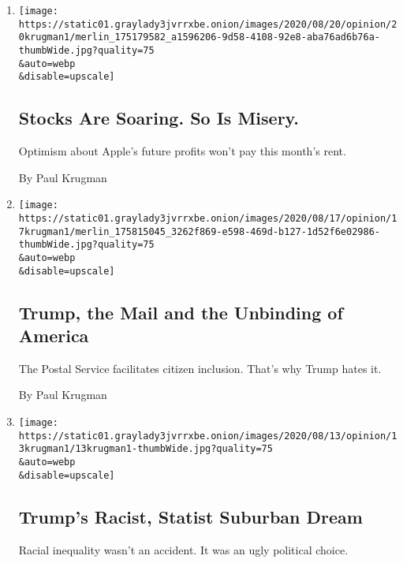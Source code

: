 \begin{enumerate}
\def\labelenumi{\arabic{enumi}.}
\item
  \href{/2020/08/20/opinion/stock-market-unemployment.html}{}

  \texttt{[image: https://static01.graylady3jvrrxbe.onion/images/2020/08/20/opinion/20krugman1/merlin\_175179582\_a1596206-9d58-4108-92e8-aba76ad6b76a-thumbWide.jpg?quality=75\\\&auto=webp\\\&disable=upscale]}

  \hypertarget{stocks-are-soaring-so-is-misery}{%
  \subsection{Stocks Are Soaring. So Is
  Misery.}\label{stocks-are-soaring-so-is-misery}}

  Optimism about Apple's future profits won't pay this month's rent.

  By Paul Krugman
\item
  \href{/2020/08/17/opinion/trump-us-mail.html}{}

  \texttt{[image: https://static01.graylady3jvrrxbe.onion/images/2020/08/17/opinion/17krugman1/merlin\_175815045\_3262f869-e598-469d-b127-1d52f6e02986-thumbWide.jpg?quality=75\\\&auto=webp\\\&disable=upscale]}

  \hypertarget{trump-the-mail-and-the-unbinding-of-america}{%
  \subsection{Trump, the Mail and the Unbinding of
  America}\label{trump-the-mail-and-the-unbinding-of-america}}

  The Postal Service facilitates citizen inclusion. That's why Trump
  hates it.

  By Paul Krugman
\item
  \href{/2020/08/13/opinion/trump-suburbs-racism.html}{}

  \texttt{[image: https://static01.graylady3jvrrxbe.onion/images/2020/08/13/opinion/13krugman1/13krugman1-thumbWide.jpg?quality=75\\\&auto=webp\\\&disable=upscale]}

  \hypertarget{trumps-racist-statist-suburban-dream}{%
  \subsection{Trump's Racist, Statist Suburban
  Dream}\label{trumps-racist-statist-suburban-dream}}

  Racial inequality wasn't an accident. It was an ugly political choice.


\end{enumerate}
